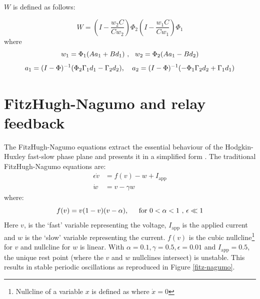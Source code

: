 \documentclass[a4paper]{article}
\begin{document}
$W$ is defined as follows:

\begin{equation}
W = \left(I - \frac{w_2C}{Cw_2}\right)\Phi_2\left(I - \frac{w_1C}{Cw_1}\right)\Phi_1
\end{equation}
where
\begin{equation}
w_1 = \Phi_1(Aa_1 + Bd_1) \text{ ,\hspace{0.3cm}} w_2 = \Phi_2(Aa_1 - Bd_2)
\end{equation}
\begin{equation}
a_1 = (I - \Phi)^{-1}(\Phi_2\Gamma_1d_1 - \Gamma_2d_2) \text{, \hspace{0.3cm}} a_2 = (I - \Phi)^{-1}(-\Phi_1\Gamma_2d_2 + \Gamma_1d_1)
\end{equation}
 




\section{FitzHugh-Nagumo and relay feedback}
The FitzHugh-Nagumo equations extract the essential behaviour of the Hodgkin-Huxley fast-slow phase plane and presents it in a simplified form \cite{keener}. The traditional FitzHugh-Nagumo equations are:
\begin{align}
\label{f_n_equations1}
\epsilon \dot{v} &= f(v) - w + I_{\text{app}}\\
\label{f_n_equations2}
\dot{w} &= v - \gamma w 
\end{align}
where:
\begin{equation}
f(v) = v(1-v)(v-\alpha), \text{\hspace{0.4cm} for }0 <\alpha<1\text{ , } \epsilon\ll 1
\end{equation}
Here $v$, is the `fast' variable representing the voltage, $I_{\text{app}}$ is the applied current and $w$ is the `slow' variable representing the current.  $f(v)$ is the cubic nullcline\footnote{Nullcline of a variable $x$ is defined as where $\dot{x} = 0$} for $v$ and nullcline for $w$ is linear. With $\alpha = 0.1, \gamma = 0.5, \epsilon = 0.01$ and $I_{\text{app}} = 0.5$, the unique rest point (where the $v$ and $w$ nullclines intersect) is unstable. This results in stable periodic oscillations \cite{keener} as reproduced in Figure \ref{fitz-nagumo}.
\end{document}
